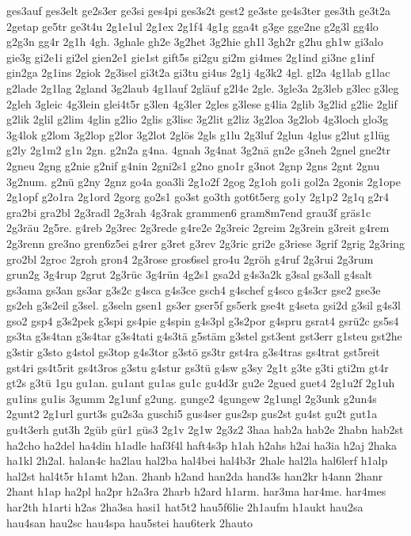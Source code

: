 {ges3auf
ges3elt
ge2s3er
ge3si
ges4pi
ges3s2t
gest2
ge3ste
ge4s3ter
ges3th
ge3t2a
2getap
ge5tr
ge3t4u
2g1e1ul
2g1ex
2g1f4
4g1g
gga4t
g3ge
gge2ne
g2g3l
gg4lo
g2g3n
gg4r
2g1h
4gh.
3ghale
gh2e
3g2het
3g2hie
gh1l
3gh2r
g2hu
gh1w
gi3alo
gie3g
gi2e1i
gi2el
gien2e1
gie1st
gift5s
gi2gu
gi2m
gi4mes
2g1ind
gi3ne
g1inf
gin2ga
2g1ins
2giok
2g3isel
gi3t2a
gi3tu
gi4us
2g1j
4g3k2
4gl.
gl2a
4g1lab
g1lac
g2lade
2g1lag
2gland
3g2laub
4g1lauf
2gläuf
g2l4e
2gle.
3gle3a
2g3leb
g3lec
g3leg
2gleh
3gleic
4g3lein
glei4t5r
g3len
4g3ler
2gles
g3lese
g4lia
2glib
3g2lid
g2lie
2glif
g2lik
2glil
g2lim
4glin
g2lio
2glis
g3lisc
3g2lit
g2liz
3g2loa
3g2lob
4g3loch
glo3g
3g4lok
g2lom
3g2lop
g2lor
3g2lot
2glös
2gls
g1lu
2g3luf
2glun
4glus
g2lut
g1lüg
g2ly
2g1m2
g1n
2gn.
g2n2a
g4na.
4gnah
3g4nat
3g2nä
gn2e
g3neh
2gnel
gne2tr
2gneu
2gng
g2nie
g2nif
g4nin
2gni2s1
g2no
gno1r
g3not
2gnp
2gns
2gnt
2gnu
3g2num.
g2nü
g2ny
2gnz
go4a
goa3li
2g1o2f
2gog
2g1oh
go1i
gol2a
2gonis
2g1ope
2g1opf
g2o1ra
2g1ord
2gorg
go2s1
go3st
go3th
got6t5erg
go1y
2g1p2
2g1q
g2r4
gra2bi
gra2bl
2g3radl
2g3rah
4g3rak
grammen6
gram8m7end
grau3f
gräs1c
2g3räu
2g5re.
g4reb
2g3rec
2g3rede
g4re2e
2g3reic
2greim
2g3rein
g3reit
g4rem
2g3renn
gre3no
gren6z5ei
g4rer
g3ret
g3rev
2g3ric
gri2e
g3riese
3grif
2grig
2g3ring
gro2bl
2groc
2groh
gron4
2g3rose
gros6sel
gro4u
2gröh
g4ruf
2g3rui
2g3rum
grun2g
3g4rup
2grut
2g3rüc
3g4rün
4g2s1
gsa2d
g4s3a2k
g3sal
gs3all
g4salt
gs3ama
gs3an
gs3ar
g3s2c
g4sca
g4s3ce
gsch4
g4schef
g4sco
g4s3cr
gse2
gse3e
gs2eh
g3s2eil
g3sel.
g3seln
gsen1
gs3er
gser5f
gs5erk
gse4t
g4seta
gsi2d
g3sil
g4s3l
gso2
gsp4
g3s2pek
g3spi
gs4pie
g4spin
g4s3pl
g3s2por
g4spru
gsrat4
gsrü2c
gs5s4
gs3ta
g3s4tan
g3s4tar
g3s4tati
g4s3tä
g5stäm
g3stel
gst3ent
gst3err
g1steu
gst2he
g3stir
g3sto
g4stol
gs3top
g4s3tor
g3stö
gs3tr
gst4ra
g3s4tras
gs4trat
gst5reit
gst4ri
gs4t5rit
gs4t3ros
g3stu
g4stur
gs3tü
g4sw
g3sy
2g1t
g3te
g3ti
gti2m
gt4r
gt2s
g3tü
1gu
gu1an.
gu1ant
gu1as
gu1c
gu4d3r
gu2e
2gued
guet4
2g1u2f
2g1uh
gu1ins
gu1is
3gumm
2g1unf
g2ung.
gunge2
4gungew
2g1ungl
2g3unk
g2un4s
2gunt2
2g1url
gurt3s
gu2s3a
guschi5
gus4ser
gus2sp
gus2st
gu4st
gu2t
gut1a
gu4t3erh
gut3h
2güb
gür1
güs3
2g1v
2g1w
2g3z2
3haa
hab2a
hab2e
2habn
hab2st
ha2cho
ha2del
ha4din
h1adle
haf3f4l
haft4s3p
h1ah
h2ahs
h2ai
ha3ia
h2aj
2haka
ha1kl
2h2al.
halan4c
ha2lau
hal2ba
hal4bei
hal4b3r
2hale
hal2la
hal6lerf
h1alp
hal2st
hal4t5r
h1amt
h2an.
2hanb
h2and
han2da
hand3s
han2kr
h4ann
2hanr
2hant
h1ap
ha2pl
ha2pr
h2a3ra
2harb
h2ard
h1arm.
har3ma
har4me.
har4mes
har2th
h1arti
h2as
2ha3sa
hasi1
hat5t2
hau5f6lie
2h1aufm
h1aukt
hau2sa
hau4san
hau2sc
hau4spa
hau5stei
hau6terk
2hauto
}
